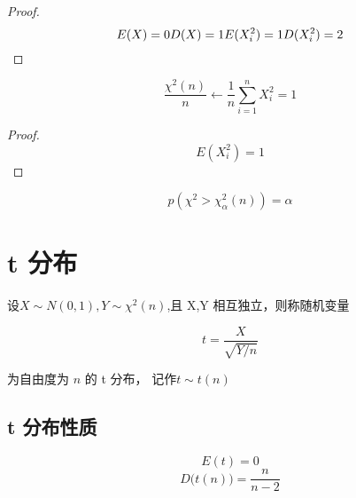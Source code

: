 \begin{proof}
    \begin{equation}
        E(X) = 0\\
        D(X) = 1\\
        E(X_i^2) = 1\\
        D(X_i^2) = 2
    \end{equation}
\end{proof}

\begin{corollary}
    \begin{equation}
        \frac{\chi^2(n)}{n} \leftarrow  \frac{1}{n} \sum^n_{i=1} X_i^2 = 1
    \end{equation}
\end{corollary}

\begin{proof}
    \begin{equation}
        E(X_i^2) = 1
    \end{equation}
\end{proof}

\begin{definition}[卡方分布的上分位点]
    \begin{equation}
        p(\chi^2 > \chi^2_\alpha(n)) = \alpha
    \end{equation}
\end{definition}

\section{t 分布}

\begin{definition}[自由度为 $t$ 的 t 分布]
    设$X \sim N(0,1), Y \sim \chi^2(n)$,且 X,Y 相互独立，则称随机变量

    \begin{equation}
        t = \frac{X}{\sqrt{Y/n}}
    \end{equation}

    为自由度为 $n$ 的 t 分布， 记作$t \sim t(n)$

\end{definition}

\subsection{t 分布性质}

\begin{corollary}[t 分布数学期望和方差]
    \begin{equation}
        E(t) = 0
    \end{equation}
    \begin{equation}
        D\big(t(n)\big) = \frac{n}{n-2}
    \end{equation}
\end{corollary}

